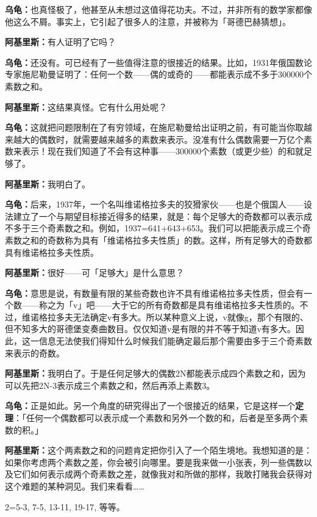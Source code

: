 \documentclass[
  12pt,
  twoside,
  openright,
  oldfontcommands,
]{memoir}
\newcommand{\heititext}[1]{{\heifamily\bfseries #1}}
\newcommand{\dialogname}[1]{{\heifamily\bfseries #1}}
\begin{document}
\dialogname{乌龟：}也真怪极了，他甚至从未想过这值得花功夫。不过，并非所有的数学家都像他这么不屑。事实上，它引起了很多人的注意，并被称为「哥德巴赫猜想」。

\dialogname{阿基里斯：}有人证明了它吗？

\dialogname{乌龟：}还没有。可已经有了一些值得注意的很接近的结果。比如，1931年俄国数论专家施尼勒曼证明了：任何一个数------偶的或奇的------都能表示成不多于300000个素数之和。

\dialogname{阿基里斯：}这结果真怪。它有什么用处呢？

\dialogname{乌龟：}这就把问题限制在了有穷领域，在施尼勒曼给出证明之前，有可能当你取越来越大的偶数时，就需要越来越多的素数来表示。没准有什么偶数需要一万亿个素数来表示！现在我们知道了不会有这种事------300000个素数（或更少些）的和就足够了。

\dialogname{阿基里斯：}我明白了。

\dialogname{乌龟：}后来，1937年，一个名叫维诺格拉多夫的狡猾家伙------也是个俄国人------设法建立了一个与期望目标接近得多的结果，就是：每个足够大的奇数都可以表示成不多于三个奇素数之和。例如，1937=641+643+653。我们可以把能表示成三个奇素数之和的奇数称为具有「维诺格拉多夫性质」的数。这样，所有足够大的奇数都具有维诺格拉多夫性质。

\dialogname{阿基里斯：}很好------可「足够大」是什么意思？

\dialogname{乌龟：}意思是说，有数量有限的某些奇数也许不具有维诺格拉多夫性质，但会有一个数------称之为「v」吧------大于它的所有奇数都是具有维诺格拉多夫性质的。不过，维诺格拉多夫无法确定v有多大。所以某种意义上说，v就像g，那个有限的、但不知多大的哥德堡变奏曲数目。仅仅知道v是有限的并不等于知道v有多大。因此，这一信息无法使我们得知什么时候我们能确定最后那个需要由多于三个奇素数来表示的奇数。

\dialogname{阿基里斯：}我明白了。于是任何足够大的偶数2N都能表示成四个素数之和，因为可以先把2N-3表示成三个素数之和，然后再添上素数3。

\dialogname{乌龟：}正是如此。另一个角度的研究得出了一个很接近的结果，它是这样一个\heititext{定理}：「任何一个偶数都可以表示成一个素数和另外一个数的和，后者是至多两个素数的积。」

\dialogname{阿基里斯：}这个两素数之和的问题肯定把你引入了一个陌生境地。我想知道的是：如果你考虑两个素数之差，你会被引向哪里。要是我来做一小张表，列一些偶数以及它们如何表示成两个奇素数之差，就像我对和所做的那样，我敢打赌我会获得对这个难题的某种洞见。我们来看看\ldots\ldots{}

2=5-3, 7-5, 13-11, 19-17, 等等。
\end{document}
